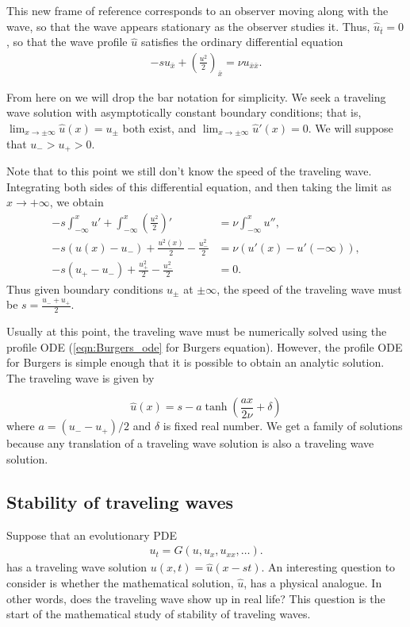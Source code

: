This new frame of reference corresponds to an observer moving along with the wave, so that the wave appears stationary as the observer studies it.
Thus, $\hat{u}_{\bar{t}} = 0$, so that the wave profile $\hat{u}$ satisfies the ordinary differential equation
\begin{align}
	 -s u_{\bar{x}}+ \left(\frac{u^2}{2} \right)_{\bar{x}} = \nu u_{\bar{x}\bar{x}}.
	\label{eqn:Burgers_ode}
\end{align}

From here on we will drop the bar notation for simplicity.
We seek a traveling wave solution with asymptotically constant boundary conditions; that is,  $\lim_{x \to \pm \infty}\hat{u}(x) = u_{\pm}$ both exist, and  $\lim_{x \to \pm \infty} \hat{u}'(x) = 0$.
We will suppose that $u_- > u_+ > 0$.

Note that to this point we still don't know the speed of the traveling wave.
Integrating both sides of this differential equation, and then taking the limit as $x \to +\infty$, we obtain
\begin{align*}
-s\int_{-\infty}^x u' + \int_{-\infty}^x \left(\frac{u^2}{2}\right)' &= \nu \int_{-\infty}^x u'',\\
-s(u(x) - u_-) + \frac{u^2(x)}{2} - \frac{u_-^2}{2} &= \nu (u'(x) - u'(-\infty)), \\
-s(u_+ - u_-) + \frac{u_+^2}{2} - \frac{u_-^2}{2} &= 0.
\end{align*}
Thus given boundary conditions $u_{\pm}$ at $\pm \infty$, the speed of the traveling wave must be $s = \frac{u_- + u_+}{2}$.

Usually at this point, the traveling wave must be numerically solved using the profile ODE (\eqref{eqn:Burgers_ode} for Burgers equation).
However, the profile ODE for Burgers is simple enough that it is possible to obtain an analytic solution.
The traveling wave is  given by

\[\hat{u}(x) = s - a \tanh \left(\frac{ax }{2\nu} + \delta\right)\]
where $a = (u_- - u_+)/2$ and $\delta$ is fixed real number.
We get a family of solutions because any translation of a traveling wave solution is also a traveling wave solution.

\subsection*{Stability of traveling waves}
Suppose that an evolutionary PDE
\begin{align}
u_t = G(u,u_x, u_{xx}, \ldots).
\label{eqn:evol_pde_repeat}
\end{align}
has a traveling wave solution $u(x,t) = \hat{u}(x-st)$.
An interesting question to consider is whether the mathematical solution, $\hat{u}$, has a physical analogue.
In other words, does the traveling wave show up in real life?
This question is the start of the mathematical study of stability of traveling waves.

